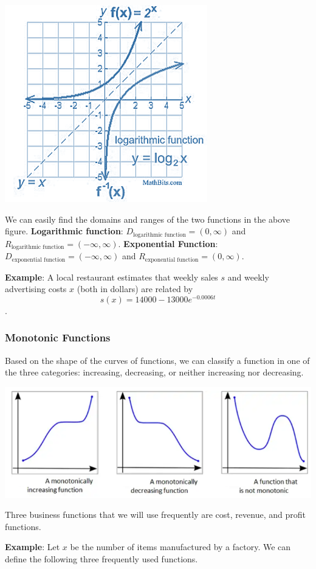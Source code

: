 \documentclass[
]{book}
\begin{document}
\begin{center}\includegraphics[width=0.4\linewidth]{img01/w01note06-LogExpFun} \end{center}

We can easily find the domains and ranges of the two functions in the above figure. \textbf{Logarithmic function}: \(D_{\text{logarithmic function}} = (0, \infty)\) and \(R_{\text{logarithmic function}} = (-\infty, \infty)\). \textbf{Exponential Function}: \(D_{\text{exponential function}} = (-\infty, \infty)\) and \(R_{\text{exponential function}} = (0, \infty)\).

\textbf{Example}: A local restaurant estimates that weekly sales \(s\) and weekly advertising costs \(x\) (both in dollars) are related by \[s(x) = 14000 - 13000e^{-0.0006t}\].

\hypertarget{monotonic-functions}{%
\subsubsection{Monotonic Functions}\label{monotonic-functions}}

Based on the shape of the curves of functions, we can classify a function in one of the three categories: increasing, decreasing, or neither increasing nor decreasing.

\begin{center}\includegraphics[width=0.6\linewidth]{img01/w01note07-MonotonicFun} \end{center}

Three business functions that we will use frequently are cost, revenue, and profit functions.

\textbf{Example}: Let \(x\) be the number of items manufactured by a factory. We can define the following three frequently used functions.
\end{document}
